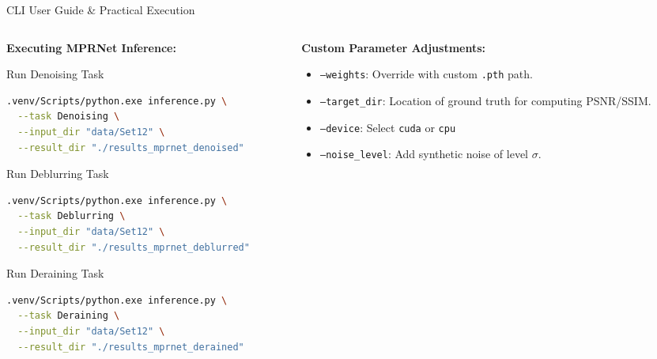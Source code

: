 \documentclass[aspectratio=169]{beamer}
\begin{document}
\begin{frame}[fragile]{CLI User Guide \& Practical Execution}
    \begin{columns}
        \begin{column}{0.5\textwidth}
            \textbf{Executing MPRNet Inference:}
            \scriptsize
            \begin{block}{Run Denoising Task}
\begin{lstlisting}[language=bash, basicstyle=\tiny\ttfamily, keywordstyle=\color{accentTeal}]
.venv/Scripts/python.exe inference.py \
  --task Denoising \
  --input_dir "data/Set12" \
  --result_dir "./results_mprnet_denoised"
\end{lstlisting}
            \end{block}
            \begin{block}{Run Deblurring Task}
\begin{lstlisting}[language=bash, basicstyle=\tiny\ttfamily, keywordstyle=\color{accentTeal}]
.venv/Scripts/python.exe inference.py \
  --task Deblurring \
  --input_dir "data/Set12" \
  --result_dir "./results_mprnet_deblurred"
\end{lstlisting}
            \end{block}
            \begin{block}{Run Deraining Task}
\begin{lstlisting}[language=bash, basicstyle=\tiny\ttfamily, keywordstyle=\color{accentTeal}]
.venv/Scripts/python.exe inference.py \
  --task Deraining \
  --input_dir "data/Set12" \
  --result_dir "./results_mprnet_derained"
\end{lstlisting}
            \end{block}
        \end{column}
        \begin{column}{0.5\textwidth}
            \textbf{Custom Parameter Adjustments:}
            \small
            \begin{itemize}
                \item \texttt{--weights}: Override with custom \texttt{.pth} path.
                \item \texttt{--target\_dir}: Location of ground truth for computing PSNR/SSIM.
                \item \texttt{--device}: Select \texttt{cuda} or \texttt{cpu}
                \item \texttt{--noise\_level}: Add synthetic noise of level $\sigma$.
            \end{itemize}
        \end{column}
    \end{columns}
\end{frame}
\end{document}
